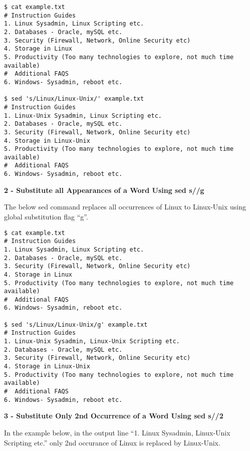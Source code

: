 \documentclass[a4paper,11pt,spanish]{article} %
\newenvironment{myscriptlisting}
{\begin{list}{}{\setlength{\leftmargin}{1em}}\item\scriptsize\bfseries}
{\end{list}}
\begin{document}
\begin{myscriptlisting}
 \begin{verbatim}
$ cat example.txt
# Instruction Guides
1. Linux Sysadmin, Linux Scripting etc.
2. Databases - Oracle, mySQL etc.
3. Security (Firewall, Network, Online Security etc)
4. Storage in Linux
5. Productivity (Too many technologies to explore, not much time available)
#  Additional FAQS
6. Windows- Sysadmin, reboot etc.

$ sed 's/Linux/Linux-Unix/' example.txt
# Instruction Guides
1. Linux-Unix Sysadmin, Linux Scripting etc.
2. Databases - Oracle, mySQL etc.
3. Security (Firewall, Network, Online Security etc)
4. Storage in Linux-Unix
5. Productivity (Too many technologies to explore, not much time available)
#  Additional FAQS
6. Windows- Sysadmin, reboot etc.
\end{verbatim}
\end{myscriptlisting}

\textbf{2 - Substitute all Appearances of a Word Using sed s//g}

The below sed command replaces all occurrences of Linux to Linux-Unix using
global substitution flag “g”.

\begin{myscriptlisting}
 \begin{verbatim}
$ cat example.txt
# Instruction Guides
1. Linux Sysadmin, Linux Scripting etc.
2. Databases - Oracle, mySQL etc.
3. Security (Firewall, Network, Online Security etc)
4. Storage in Linux
5. Productivity (Too many technologies to explore, not much time available)
#  Additional FAQS
6. Windows- Sysadmin, reboot etc.

$ sed 's/Linux/Linux-Unix/g' example.txt
# Instruction Guides
1. Linux-Unix Sysadmin, Linux-Unix Scripting etc.
2. Databases - Oracle, mySQL etc.
3. Security (Firewall, Network, Online Security etc)
4. Storage in Linux-Unix
5. Productivity (Too many technologies to explore, not much time available)
#  Additional FAQS
6. Windows- Sysadmin, reboot etc.
 \end{verbatim}
\end{myscriptlisting}

\textbf{3 - Substitute Only 2nd Occurrence of a Word Using sed s//2}

In the example below, in the output line “1. Linux Sysadmin, Linux-Unix Scripting
etc.” only 2nd occurance of Linux is replaced by Linux-Unix.
\end{document}
